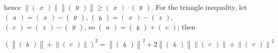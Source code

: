 hence \(\left\| \begin{pmatrix}
x
\end{pmatrix} \right\|\left\| \begin{pmatrix}
y
\end{pmatrix} \right\| \geq \begin{pmatrix}
x
\end{pmatrix} \cdot \begin{pmatrix}
y
\end{pmatrix}\). For the triangle inequality, let \(\begin{pmatrix}
a
\end{pmatrix} = \begin{pmatrix}
x
\end{pmatrix} - \begin{pmatrix}
y
\end{pmatrix}\), \(\begin{pmatrix}
b
\end{pmatrix} = \begin{pmatrix}
x
\end{pmatrix} - \begin{pmatrix}
z
\end{pmatrix}\), \(\begin{pmatrix}
c
\end{pmatrix} = \begin{pmatrix}
z
\end{pmatrix} - \begin{pmatrix}
y
\end{pmatrix}\), so \(\begin{pmatrix}
a
\end{pmatrix} = \begin{pmatrix}
b
\end{pmatrix} + \begin{pmatrix}
c
\end{pmatrix}\); then

\(\left( {\left\| \begin{pmatrix}
b
\end{pmatrix} \right\| + \left\| \begin{pmatrix}
c
\end{pmatrix} \right\|} \right)^{2} = \left\| \begin{pmatrix}
b
\end{pmatrix} \right\|^{2} + 2\left\| \begin{pmatrix}
b
\end{pmatrix} \right\|\left\| \begin{pmatrix}
c
\end{pmatrix} \right\| + \left\| \begin{pmatrix}
c
\end{pmatrix} \right\|^{2}\)

